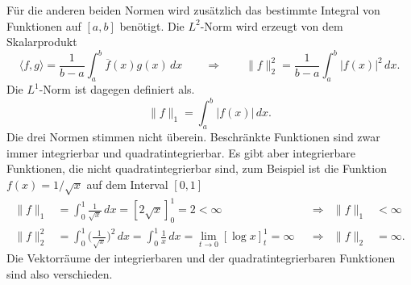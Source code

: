 Für die anderen beiden Normen wird zusätzlich das bestimmte Integral
von Funktionen auf $[a,b]$ benötigt.
Die $L^2$-Norm wird erzeugt von dem Skalarprodukt
%
%
\[
\langle f,g\rangle
=
\frac{1}{b-a}
\int_a^b \overline{f}(x)g(x)\,dx
\qquad\Rightarrow\qquad
\|f\|_2^2 = \frac{1}{b-a}\int_a^b |f(x)|^2\,dx.
\]
Die $L^1$-Norm ist dagegen definiert als.
\[
\|f\|_1
=
\int_a^b |f(x)|\,dx.
\]
Die drei Normen stimmen nicht überein.
Beschränkte Funktionen sind zwar immer integrierbar und quadratintegrierbar.
Es gibt aber integrierbare Funktionen, die nicht quadratintegrierbar sind, zum
Beispiel ist die Funktion $f(x)=1/\sqrt{x}$ auf dem Interval $[0,1]$
\begin{align*}
\|f\|_1
&=
\int_0^1 \frac 1{\sqrt{x}}\,dx
=
[2\sqrt{x}]_0^1
=
2
<
\infty
&&\Rightarrow& \|f\|_1&<\infty
\\
\|f\|_2^2
&=
\int_0^1 \biggl(\frac1{\sqrt{x}}\biggr)^2\,dx
=
\int_0^1 \frac1x\,dx
=
\lim_{t\to 0} [\log x]_t^1 = \infty
&&\Rightarrow&
\|f\|_2 &= \infty.
\end{align*}
Die Vektorräume der integrierbaren und der quadratintegrierbaren Funktionen
sind also verschieden.


